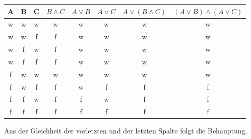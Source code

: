 \documentclass{article}
\begin{document}
\begin{center}
\begin{tabular}{ |c|c|c|c|c|c|c|c| }
 \hline
 A & B & C & \(B \wedge C\) & \(A \lor B\) & \(A \lor C\) & \(A \lor (B \wedge C)\)& \((A \lor B) \wedge (A \lor C)\) \\
 \hline\hline
 w & w & w & w & w & w & w & w \\
 w & w & f & f & w & w & w & w \\
 w & f & w & f & w & w & w & w \\
 w & f & f & f & w & w & w & w \\
 f & w & w & w & w & w & w & w \\
 f & w & f & f & w & f & f & f \\
 f & f & w & f & f & w & f & f \\
 f & f & f & f & f & f & f & f \\
 \hline
\end{tabular}
\end{center}

Aus der Gleichheit der vorletzten und der letzten Spalte folgt die Behauptung.
\end{document}
